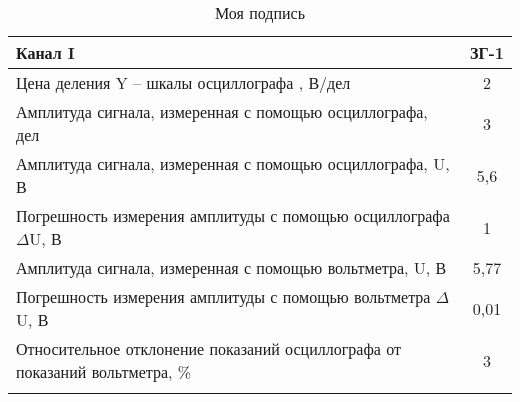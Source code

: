 \documentclass{article}%
\begin{document}
%
\normalsize%
\begin{longtable}{| l | c |}%
\hline%
\rowcolor{lightgray}%
\textbf{Канал I}&\textbf{ЗГ{-}1}\\%
\hline%
Цена деления Y – шкалы осциллографа , В/дел&2\\%
\hline%
Амплитуда сигнала, измеренная с помощью осциллографа, дел&3\\%
\hline%
Амплитуда сигнала, измеренная с помощью осциллографа, U, В&5,6\\%
\hline%
Погрешность измерения амплитуды с помощью осциллографа $\Delta$U, В&1\\%
\hline%
Амплитуда сигнала, измеренная с помощью вольтметра, U, В&5,77\\%
\hline%
Погрешность измерения амплитуды с помощью вольтметра $\Delta$U, В&0,01\\%
\hline%
Относительное отклонение показаний осциллографа от показаний вольтметра, \%&3\\%
\hline%
\caption{Моя подпись}%
\label{table1}%
\end{longtable}%
\renewcommand{\arraystretch}{1.5}%
\end{document}
